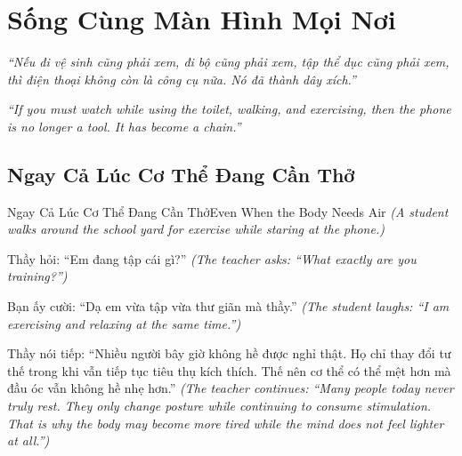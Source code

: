 \chapter{Sống Cùng Màn Hình Mọi Nơi}

\begin{center}
	\textit{\color{bookprimary}``Nếu đi vệ sinh cũng phải xem, đi bộ cũng phải xem, tập thể dục cũng phải xem, thì điện thoại không còn là công cụ nữa. Nó đã thành dây xích.''}

	\textit{\color{bookprimary}``If you must watch while using the toilet, walking, and exercising, then the phone is no longer a tool. It has become a chain.''}
\end{center}

\ngancach

\section{Ngay Cả Lúc Cơ Thể Đang Cần Thở}
\begin{truyen}{Ngay Cả Lúc Cơ Thể Đang Cần Thở}{Even When the Body Needs Air}
\textit{(A student walks around the school yard for exercise while staring at the phone.)}

Thầy hỏi: ``Em đang tập cái gì?''
\textit{(The teacher asks: ``What exactly are you training?'')}

Bạn ấy cười: ``Dạ em vừa tập vừa thư giãn mà thầy.''
\textit{(The student laughs: ``I am exercising and relaxing at the same time.'')}


Thầy nói tiếp: ``Nhiều người bây giờ không hề được nghỉ thật. Họ chỉ thay đổi tư thế trong khi vẫn tiếp tục tiêu thụ kích thích. Thế nên cơ thể có thể mệt hơn mà đầu óc vẫn không hề nhẹ hơn.''
\textit{(The teacher continues: ``Many people today never truly rest. They only change posture while continuing to consume stimulation. That is why the body may become more tired while the mind does not feel lighter at all.'')}
\end{truyen}


